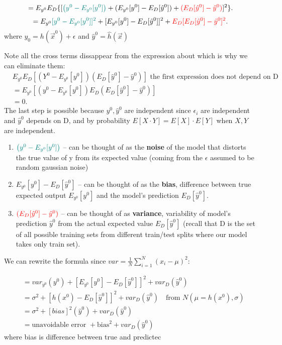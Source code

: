 \documentclass[a4paper]{article}
\begin{document}
  \[
  =E_{y^0} E_D \{[ \textcolor{teal}{\left( y^0 - E_{y^0} [y^0] \right)} +  (E_{y^0} [y^0] - E_D[\hat{y}^0]) + \textcolor{red}{(E_D[\hat{y}^0] - \hat{y}^0)}]^2 \}
  .\] 
    \[
      = E_{y^0} \textcolor{teal}{[y^0 - E_{y^0} [y^0]]^2} + [E_{y^0} [y^0] - E_D[\hat{y}^0]]^2 + \textcolor{red}{
      E_D[E_D[\hat{y}^0] - \hat{y}^0]^2} 
  .\] 
  where $y_0 = h(\vec{x}^0) + \epsilon$ and $\hat{y}^0 = \hat{h}\left( \vec{x} \right)$ 
  \begin{note}
    Note all the cross terms dissappear from the expression about which is why we can eliminate them:
    \begin{align*}
      & E_{y^0}E_D [ (Y^0 - E_{y^0} [y^0]) \left( E_D [\hat{y}^0] - \hat{y}^0 \right) ] \text{  the first expression does not depend on D} \\
      &= E_{y^0} [\left( y^0 - E_{y^0} [y^0] \right) E_D \left( E_D [\hat{y}^0] - \hat{y}^0 \right)] \\
      &= 0
    .\end{align*}
    The last step is possible because $y^0, \hat{y}^0$ are independent since $\epsilon_i$ are independent and 
    $\hat{y}^0$ depends on D, and by probability $E[X \cdot Y] = E[X] \cdot E[Y]$ when $X,Y$ are independent.
  \end{note}
  \begin{enumerate}
    \item $\textcolor{teal}{\left( y^0 - E_{y^0} [y^0] \right)}$ -- can be thought of as the \textbf{noise} of the model that distorts the true value of y 
      from its expected value (coming from the $\epsilon$ assumed to be random gaussian noise)
    \item $E_{y^0} [y^0] - E_D[\hat{y}^0]$ -- can be thought of as the \textbf{bias}, difference between true expected output $E_{y^0} [y^0]$ 
      and the model's prediction $ E_D[\hat{y}^0]$.
    \item $ \textcolor{red}{(E_D[\hat{y}^0] - \hat{y}^0)}$ -- can be thought of as \textbf{variance}, variability of model's prediction $\hat{y}^0$ from the 
      actual expected value $E_D[\hat{y}^0]$ (recall that D is the set of all possible training sets from different train/test splits where our 
      model takes only train set).
  \end{enumerate}
  
  We can rewrite the formula since $var = \frac{1}{N} \sum_{i=1}^N (x_i - \mu)^2$:

\begin{align*}
    &= var_{y^0} (y^0) + \left[E_{y^0} [y^0] - E_D [\hat{y}^0]\right]^2 + var_D (\hat{y}^0) \\
    &= \sigma^2 + \left[h(x^0) - E_D[\hat{y}^0]\right]^2 + var_D(\hat{y}^0) \quad \text{from } N(\mu = h(x^0), \sigma) \\
    &= \sigma^2 + \left[bias\right]^2 (\hat{y}^0) + var_D (\hat{y}^0) \\
    &= \text{unavoidable error } + \text{bias}^2 + var_D(\hat{y}^0)
\end{align*}
  where bias is difference between true and predictec
  
\end{document}
